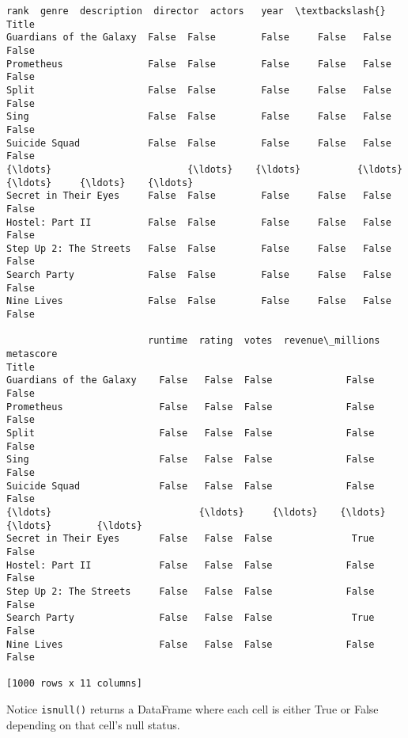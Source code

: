 \documentclass[11pt]{article}
\makeatletter
\newcommand{\boxspacing}{\kern\kvtcb@left@rule\kern\kvtcb@boxsep}
\newcommand{\prompt}[4]{
        {\ttfamily\llap{{\color{#2}[#3]:\hspace{3pt}#4}}\vspace{-\baselineskip}}
    }
\makeatother
\begin{document}
            \begin{tcolorbox}[breakable, size=fbox, boxrule=.5pt, pad at break*=1mm, opacityfill=0]
\prompt{Out}{outcolor}{24}{\boxspacing}
\begin{Verbatim}[commandchars=\\\{\}]
                          rank  genre  description  director  actors   year  \textbackslash{}
Title
Guardians of the Galaxy  False  False        False     False   False  False
Prometheus               False  False        False     False   False  False
Split                    False  False        False     False   False  False
Sing                     False  False        False     False   False  False
Suicide Squad            False  False        False     False   False  False
{\ldots}                        {\ldots}    {\ldots}          {\ldots}       {\ldots}     {\ldots}    {\ldots}
Secret in Their Eyes     False  False        False     False   False  False
Hostel: Part II          False  False        False     False   False  False
Step Up 2: The Streets   False  False        False     False   False  False
Search Party             False  False        False     False   False  False
Nine Lives               False  False        False     False   False  False

                         runtime  rating  votes  revenue\_millions  metascore
Title
Guardians of the Galaxy    False   False  False             False      False
Prometheus                 False   False  False             False      False
Split                      False   False  False             False      False
Sing                       False   False  False             False      False
Suicide Squad              False   False  False             False      False
{\ldots}                          {\ldots}     {\ldots}    {\ldots}               {\ldots}        {\ldots}
Secret in Their Eyes       False   False  False              True      False
Hostel: Part II            False   False  False             False      False
Step Up 2: The Streets     False   False  False             False      False
Search Party               False   False  False              True      False
Nine Lives                 False   False  False             False      False

[1000 rows x 11 columns]
\end{Verbatim}
\end{tcolorbox}
        
    Notice \texttt{isnull()} returns a DataFrame where each cell is either
True or False depending on that cell's null status.
\end{document}

